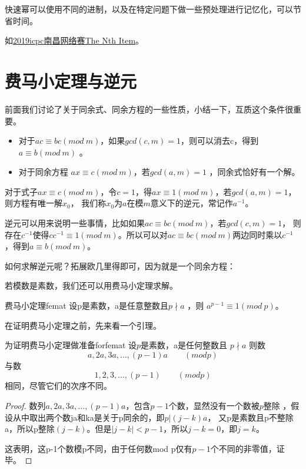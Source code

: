 \begin{note}
	快速幂可以使用不同的进制，以及在特定问题下做一些预处理进行记忆化，可以节省时间。
	
	如\href{https://nanti.jisuanke.com/t/41355}{2019icpc南昌网络赛\quad The Nth Item}。
\end{note}


\section{费马小定理与逆元}
前面我们讨论了关于同余式、同余方程的一些性质，小结一下，互质这个条件很重要。

\begin{itemize}
	\item 对于$ac\equiv bc(mod \ m)$，如果$gcd(c,m)=1$，则可以消去c，得到$a\equiv b(mod \ m)$ 。
	\item 对于同余方程 $ax\equiv c(mod\ m)$，若$gcd(a,m)=1$ ，同余式恰好有一个解。
\end{itemize}

{\heiti 对于式子$ax\equiv c(mod\ m)$，令$c=1$，得$ax\equiv 1(mod\ m)$，若$gcd(a,m)=1$，则方程有唯一解$x_0$，
我们称$x_0$为$a$在模$m$意义下的逆元，常记作$a^{-1}$。}

逆元可以用来说明一些事情，比如如果$ac\equiv bc(mod\ m)$，若$gcd(c,m)=1$，
则存在$c^{-1}$使得$cc^{-1}\equiv 1 (mod\ m)$。所以可以对$ac\equiv bc(mod\ m)$两边同时乘以$c^{-1}$，得到$a\equiv b(mod\ m)$。

如何求解逆元呢？拓展欧几里得即可，因为就是一个同余方程：


\vbox{}

若模数是素数，我们还可以用费马小定理求解。

\begin{theorem}{费马小定理}{femat}
	设p是素数，a是任意整数且$p\nmid a$ ，则 $a^{p-1}\equiv 1(mod\ p)$。 
\end{theorem}

在证明费马小定理之前，先来看一个引理。

\begin{lemma}{为证明费马小定理做准备}{forfemat}
	设$p$是素数，a是任何整数且 $p\nmid a$ 则数
	$$
	a,2a,3a,...,(p-1)a\qquad (modp)
	$$
	与数
	$$
	1,2,3,...,(p-1)\qquad (modp)
	$$
	相同，尽管它们的次序不同。
\end{lemma}

\begin{proof}
	数列$a,2a,3a,...,(p-1)a$，包含$p-1$个数，显然没有一个数被$p$整除 ，假设从中取出两个数ja和ka是关于p同余的，即$p|(j-k)a$，
	又p是素数且p不整除a，所以p整除$(j-k)$。但是$|j-k|<p-1 $，所以$j-k=0$，即$j=k$。
	
	这表明，这p-1个数模p不同，由于任何数mod p仅有$p-1$个不同的非零值，证毕。
\end{proof}

